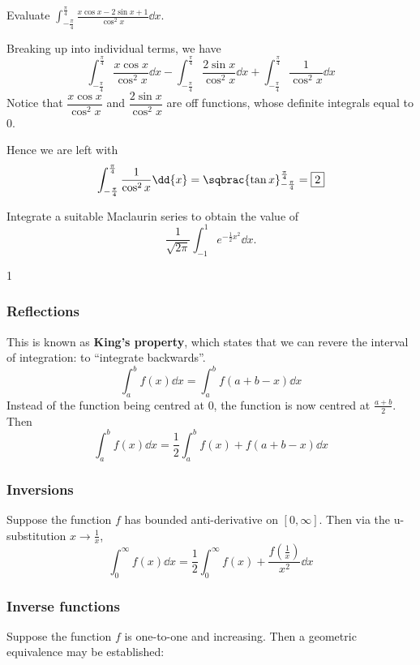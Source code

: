 \begin{exercise}{}{}
Evaluate $\displaystyle\int_{-\frac{\pi}{4}}^\frac{\pi}{4}\frac{x\cos x-2\sin x+1}{\cos^2x}\dd{x}$.
\end{exercise}
\begin{solution}
Breaking up into individual terms, we have
\[ \int_{-\frac{\pi}{4}}^\frac{\pi}{4}\frac{x\cos x}{\cos^2x}\dd{x}-\int_{-\frac{\pi}{4}}^\frac{\pi}{4}\frac{2\sin x}{\cos^2x}\dd{x}+\int_{-\frac{\pi}{4}}^\frac{\pi}{4}\frac{1}{\cos^2x}\dd{x} \]
Notice that $\dfrac{x\cos x}{\cos^2x}$ and $\dfrac{2\sin x}{\cos^2x}$ are off functions, whose definite integrals equal to $0$.

Hence we are left with 
\[ \int_{-\frac{\pi}{4}}^\frac{\pi}{4}\frac{1}{\cos^2x}\dd{x}=\sqbrac{\tan x}_{-\frac{\pi}{4}}^\frac{\pi}{4}=\boxed{2} \]
\end{solution}

\begin{exercise}{}{}
Integrate a suitable Maclaurin series to obtain the value of
\[ \frac{1}{\sqrt{2\pi}}\int_{-1}^1e^{-\frac{1}{2}x^2}\dd{x}. \]
\end{exercise}
\begin{solution}
1
\end{solution}

\subsubsection{Reflections}
This is known as \textbf{King's property}, which states that we can revere the interval of integration: to ``integrate backwards''.
\begin{equation}
\int_a^b f(x)\dd{x} = \int_a^b f(a+b-x)\dd{x}
\end{equation}
Instead of the function being centred at 0, the function is now centred at $\frac{a+b}{2}$. Then
\[ \int_a^b f(x)\dd{x} = \frac{1}{2} \int_a^b f(x) + f(a+b-x)\dd{x} \]

\subsubsection{Inversions}
Suppose the function $f$ has bounded anti-derivative on $[0,\infty]$. Then via the u-substitution $x\to\frac{1}{x}$,
\[ \int_0^\infty f(x)\dd{x} = \frac{1}{2}\int_0^\infty f(x) + \frac{f(\frac{1}{x})}{x^2}\dd{x} \]

\subsubsection{Inverse functions}
Suppose the function $f$ is one-to-one and increasing. Then a geometric equivalence may be established:


